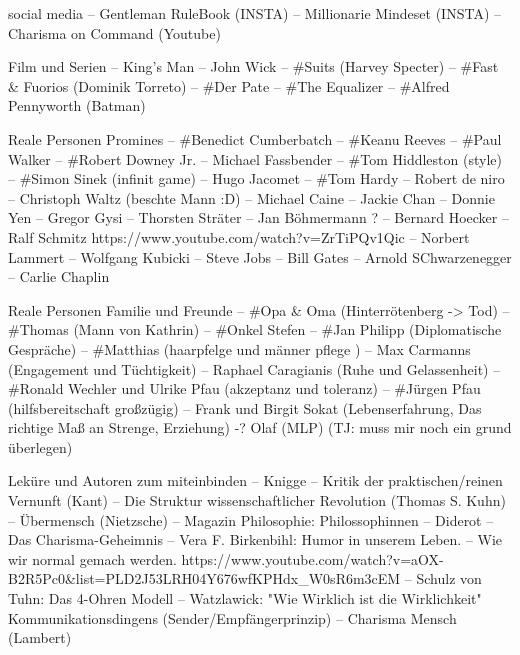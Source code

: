 social media
            -- Gentleman RuleBook (INSTA)
            -- Millionarie Mindeset (INSTA)
            -- Charisma on Command (Youtube)

Film und Serien
            -- King's Man
            -- John Wick 
            -- #Suits (Harvey Specter)
            -- #Fast & Fuorios (Dominik Torreto)
            -- #Der Pate
            -- #The Equalizer
            -- #Alfred Pennyworth (Batman)

Reale Personen Promines
            -- #Benedict Cumberbatch
            -- #Keanu Reeves
            -- #Paul Walker
            -- #Robert Downey Jr. 
            -- Michael Fassbender
            -- #Tom Hiddleston (style)
            -- #Simon Sinek (infinit game)
            -- Hugo Jacomet
            -- #Tom Hardy
            -- Robert de niro
            -- Christoph Waltz (beschte Mann :D)
            -- Michael Caine
            -- Jackie Chan
            -- Donnie Yen
            -- Gregor Gysi
            -- Thorsten Sträter
            -- Jan Böhmermann ? 
            -- Bernard Hoecker
            -- Ralf Schmitz
               https://www.youtube.com/watch?v=ZrTiPQv1Qic
            -- Norbert Lammert
            -- Wolfgang Kubicki
            -- Steve Jobs
            -- Bill Gates
            -- Arnold SChwarzenegger
            -- Carlie Chaplin 
                
Reale Personen Familie und Freunde
            -- #Opa & Oma (Hinterrötenberg -> Tod)
            -- #Thomas (Mann von Kathrin)
            -- #Onkel Stefen
            -- #Jan Philipp  (Diplomatische Gespräche)
            -- #Matthias (haarpfelge und männer pflege )
            -- Max Carmanns (Engagement und Tüchtigkeit)
            -- Raphael Caragianis (Ruhe und Gelassenheit)
            -- #Ronald Wechler und Ulrike Pfau (akzeptanz und toleranz)
            -- #Jürgen Pfau (hilfsbereitschaft großzügig)
            -- Frank und Birgit Sokat (Lebenserfahrung, Das richtige Maß an Strenge, Erziehung)
            -? Olaf (MLP) (TJ: muss mir noch ein grund überlegen)

Leküre und Autoren zum miteinbinden
            -- Knigge
            -- Kritik der praktischen/reinen Vernunft (Kant)
            -- Die Struktur wissenschaftlicher Revolution (Thomas S. Kuhn)
            -- Übermensch (Nietzsche)
            -- Magazin Philosophie: Philossophinnen
            -- Diderot
            -- Das Charisma-Geheimnis 
            -- Vera F. Birkenbihl:  Humor in unserem Leben.
            --                      Wie wir normal gemach werden.
                                    https://www.youtube.com/watch?v=aOX-B2R5Pc0&list=PLD2J53LRH04Y676wfKPHdx_W0sR6m3cEM
            -- Schulz von Tuhn: Das 4-Ohren Modell
            -- Watzlawick:    "Wie Wirklich ist die Wirklichkeit"
                              Kommunikationsdingens (Sender/Empfängerprinzip)
            -- Charisma Mensch (Lambert)

